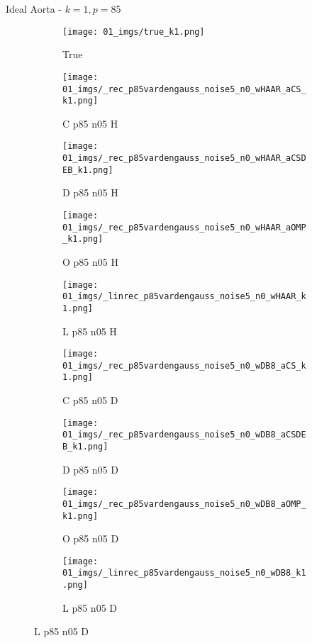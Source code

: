 \begin{frame}{Ideal Aorta - $k=1,p=85$}{}
\begin{figure}

\begin{subfigure}{0.1\textwidth}
\texttt{[image: 01\_imgs/true\_k1.png]}
\caption*{\Tiny True}
\end{subfigure}
\begin{subfigure}{0.1\textwidth}
\texttt{[image: 01\_imgs/\_rec\_p85vardengauss\_noise5\_n0\_wHAAR\_aCS\_k1.png]}
\caption*{\Tiny C p85 n05 H}
\end{subfigure}
\begin{subfigure}{0.1\textwidth}
\texttt{[image: 01\_imgs/\_rec\_p85vardengauss\_noise5\_n0\_wHAAR\_aCSDEB\_k1.png]}
\caption*{\Tiny D p85 n05 H}
\end{subfigure}
\begin{subfigure}{0.1\textwidth}
\texttt{[image: 01\_imgs/\_rec\_p85vardengauss\_noise5\_n0\_wHAAR\_aOMP\_k1.png]}
\caption*{\Tiny O p85 n05 H}
\end{subfigure}
\begin{subfigure}{0.1\textwidth}
\texttt{[image: 01\_imgs/\_linrec\_p85vardengauss\_noise5\_n0\_wHAAR\_k1.png]}
\caption*{\Tiny L p85 n05 H}
\end{subfigure}
\begin{subfigure}{0.1\textwidth}
\texttt{[image: 01\_imgs/\_rec\_p85vardengauss\_noise5\_n0\_wDB8\_aCS\_k1.png]}
\caption*{\Tiny C p85 n05 D}
\end{subfigure}
\begin{subfigure}{0.1\textwidth}
\texttt{[image: 01\_imgs/\_rec\_p85vardengauss\_noise5\_n0\_wDB8\_aCSDEB\_k1.png]}
\caption*{\Tiny D p85 n05 D}
\end{subfigure}
\begin{subfigure}{0.1\textwidth}
\texttt{[image: 01\_imgs/\_rec\_p85vardengauss\_noise5\_n0\_wDB8\_aOMP\_k1.png]}
\caption*{\Tiny O p85 n05 D}
\end{subfigure}
\begin{subfigure}{0.1\textwidth}
\texttt{[image: 01\_imgs/\_linrec\_p85vardengauss\_noise5\_n0\_wDB8\_k1.png]}
\caption*{\Tiny L p85 n05 D}
\end{subfigure}

\vspace{5pt}


\end{figure}
\end{frame}
